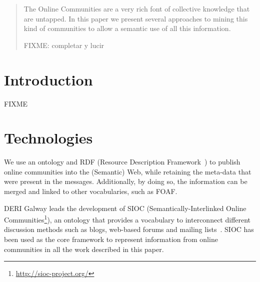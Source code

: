 \documentclass{../templates/www2008-submission}
\begin{document}


\maketitle

\begin{abstract}
The Online Communities are a very rich font of collective 
knowledge that are untapped. In this paper we present 
several approaches to mining this kind of communities to 
allow a semantic use of all this  information.

FIXME: completar y lucir
\end{abstract}



\section{Introduction}

FIXME

\section{Technologies}

We use an ontology and RDF (Resource Description
Framework~\cite{RDF}) to publish online communities into 
the (Semantic) Web, while retaining the meta-data that were present in 
the messages. Additionally, by doing so, the information can be
merged and linked to other vocabularies, such as FOAF.

DERI Galway leads the development of SIOC (Semantically-Interlinked Online
Communities\footnote{\url{http://sioc-project.org/}}), an ontology that 
provides a vocabulary to interconnect different discussion methods such 
as blogs, web-based forums and mailing lists~\cite{Breslin2006,Breslin2005}.
SIOC has been used as the core framework to represent information from
online communities in all the work described in this paper.
\end{document}
